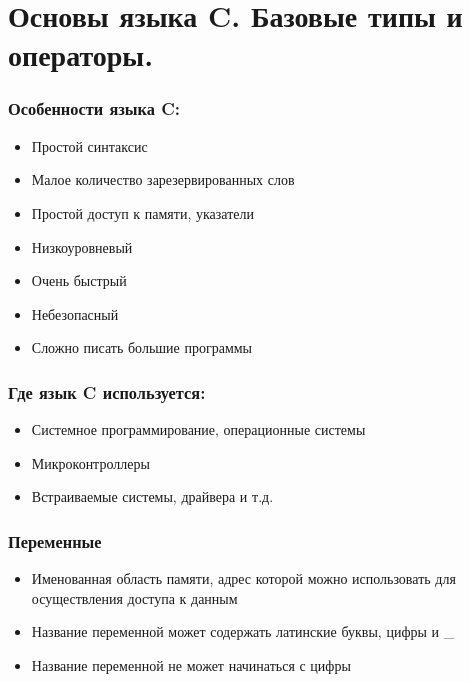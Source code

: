 \documentclass[12pt,pdf,hyperref={unicode}]{beamer}
\begin{document}
\section{Основы языка C. Базовые типы и операторы.}

\begin{frame}
\frametitle{Особенности языка C:} 
\begin{center}
\begin{itemize}
\item Простой синтаксис
\item Малое количество зарезервированных слов
\item Простой доступ к памяти, указатели
\item Низкоуровневый
\item Очень быстрый
\item Небезопасный
\item Сложно писать большие программы
\end{itemize}
\end{center}
\end{frame}

\begin{frame}
\frametitle{Где язык C используется:} 
\begin{center}
\begin{itemize}
\item Системное программирование, операционные системы
\item Микроконтроллеры
\item Встраиваемые системы, драйвера и т.д.
\end{itemize}
\end{center}
\end{frame}

\begin{frame}
\frametitle{Переменные} 
\begin{center}
\begin{itemize}

\item Именованная область памяти, адрес которой можно использовать для осуществления доступа к данным
\item Название переменной может содержать латинские буквы, цифры и \_
\item Название переменной не может начинаться с цифры
\end{itemize}
\end{center}
\end{frame}
\end{document}
